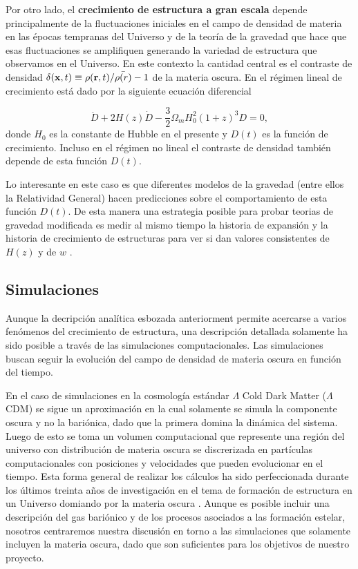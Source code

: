 Por otro lado, el {\bf crecimiento de estructura a gran escala} depende
principalmente de la fluctuaciones iniciales en el campo de densidad
de materia en las \'epocas tempranas del Universo y de la teor\'ia de
la gravedad que hace que esas fluctuaciones se amplifiquen generando
la variedad de estructura que observamos en el Universo. En este
contexto la cantidad central es el contraste de densidad $\delta({\bf
  x},t)\equiv\rho({\bf r},t)/\bar{\rho(r)}-1$ de la materia oscura. En
el r\'egimen lineal de crecimiento est\'a dado por la siguiente
ecuaci\'on diferencial 

\begin{equation}
\ddot{D} + 2H(z)\dot{D}- \frac{3}{2}\Omega_mH_{0}^2(1+z)^3D=0,
\end{equation}
%
donde $H_0$ es la constante de Hubble en el presente y $D(t)$ es la
funci\'on de crecimiento. Incluso en el r\'egimen no lineal el
contraste de densidad tambi\'en depende de esta funci\'on $D(t)$.  

Lo interesante en este caso es que diferentes modelos de la gravedad
(entre ellos la Relatividad General) hacen predicciones sobre el
comportamiento de esta funci\'on $D(t)$. De esta manera una estrategia
posible para probar teorias de gravedad modificada es medir al mismo
tiempo la historia de expansi\'on y la historia de crecimiento de
estructuras para ver si dan valores consistentes de $H(z)$ y de
$w$ \cite{2014arXiv1401.0046M}. 

\subsection{Simulaciones}

Aunque la decripci\'on anal\'itica esbozada anteriorment
permite acercarse a varios fen\'omenos del crecimiento de estructura,
una descripci\'on detallada solamente ha sido posible a trav\'es de
las simulaciones computacionales. Las simulaciones buscan seguir la
evoluci\'on del campo de densidad de materia oscura en funci\'on del
tiempo. 

En el caso de simulaciones en la cosmolog\'ia est\'andar $\Lambda$
Cold Dark Matter ($\Lambda$CDM) se sigue un aproximaci\'on en la cual
solamente se simula la componente oscura y no la bari\'onica, dado que
la primera domina la din\'amica del sistema. Luego de esto se toma un
volumen computacional que represente una regi\'on del universo con
distribuci\'on de materia oscura se discrerizada en part\'iculas
computacionales con posiciones y velocidades que pueden evolucionar en
el tiempo.  Esta forma general de realizar los c\'alculos ha sido
perfeccionada durante los \'ultimos treinta a\~nos de investigaci\'on
en el tema de formaci\'on de estructura en un Universo domiando por la
materia oscura
\cite{1985ApJ...292..371D,1999ApJ...522...82K,2005Natur.435..629S}.
Aunque es posible incluir una descripci\'on del gas bari\'onico y de
los procesos asociados a las formaci\'on estelar, nosotros centraremos
nuestra discusi\'on en torno a las simulaciones que solamente incluyen
la materia oscura, dado que son suficientes para los objetivos de
nuestro proyecto.


